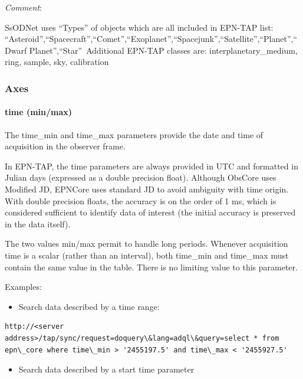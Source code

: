 \documentclass[11pt,a4paper]{ivoa}
\begin{document}
\emph{Comment}: 

SsODNet uses ``Types'' of objects which are all included in EPN-TAP list: ``Asteroid'',``Spacecraft'',``Comet'',``Exoplanet'',``Spacejunk'',``Satellite'',``Planet'',``Dwarf Planet'',``Star'' Additional EPN-TAP classes are: interplanetary\_medium, ring, sample, sky, calibration \\

\subsubsection{Axes \\}

\paragraph{time (min/max)}

The time\_min and time\_max parameters provide the date and time of acquisition in the observer frame. 

In EPN-TAP, the time parameters are always provided in UTC and formatted in Julian days (expressed as a double precision float). Although ObsCore uses Modified JD, EPNCore uses standard JD to avoid ambiguity with time origin. With double precision floats, the accuracy is on the order of 1 ms, which is considered sufficient to identify data of interest (the initial accuracy is preserved in the data itself).

The two values min/max permit to handle long periods. Whenever acquisition time is a scalar (rather than an interval), both time\_min and time\_max must contain the same value in the table. There is no limiting value to this parameter.

Examples:

\begin{itemize}
\item Search data described by a time range:
\end{itemize}






\begin{verbatim}http://<server address>/tap/sync/request=doquery\&lang=adql\&query=select * from epn\_core where time\_min > '2455197.5' and time\_max < '2455927.5'\end{verbatim}




\begin{itemize}
\item Search data described by a start time parameter
\end{itemize}
\end{document}
